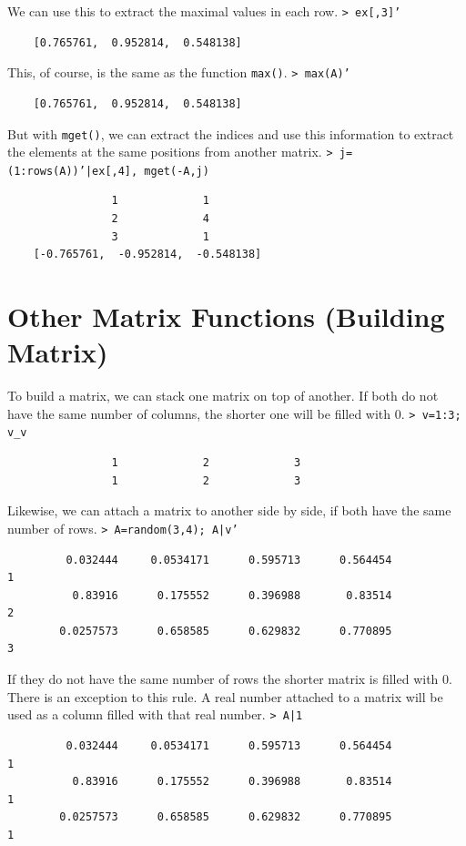 \documentclass[11pt, a4paper]{article}
\newcommand{\emtcmd}[1]{\noindent\texttt{\textcolor{emtcommand}{>}\ #1}\par\smallskip}
\begin{document}
We can use this to extract the maximal values in each row.
\emtcmd{ex[,3]'}
\begin{verbatim}
    [0.765761,  0.952814,  0.548138]
\end{verbatim}

This, of course, is the same as the function \texttt{max()}.
\emtcmd{max(A)'}
\begin{verbatim}
    [0.765761,  0.952814,  0.548138]
\end{verbatim}

But with \texttt{mget()}, we can extract the indices and use this information to extract the elements at the same positions from another matrix.
\emtcmd{j=(1:rows(A))'|ex[,4], mget(-A,j)}
\begin{verbatim}
                1             1
                2             4
                3             1
    [-0.765761,  -0.952814,  -0.548138]
\end{verbatim}

\section*{Other Matrix Functions (Building Matrix)}

To build a matrix, we can stack one matrix on top of another. If both do not have the same number of columns, the shorter one will be filled with 0.
\emtcmd{v=1:3; v\_v}
\begin{verbatim}
                1             2             3
                1             2             3
\end{verbatim}

Likewise, we can attach a matrix to another side by side, if both have the same number of rows.
\emtcmd{A=random(3,4); A|v'}
\begin{verbatim}
         0.032444     0.0534171      0.595713      0.564454             1
          0.83916      0.175552      0.396988       0.83514             2
        0.0257573      0.658585      0.629832      0.770895             3
\end{verbatim}

If they do not have the same number of rows the shorter matrix is filled with 0. There is an exception to this rule. A real number attached to a matrix will be used as a column filled with that real number.
\emtcmd{A|1}
\begin{verbatim}
         0.032444     0.0534171      0.595713      0.564454             1
          0.83916      0.175552      0.396988       0.83514             1
        0.0257573      0.658585      0.629832      0.770895             1
\end{verbatim}
\end{document}
